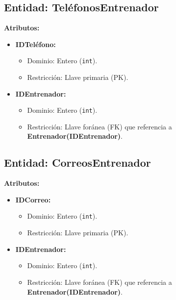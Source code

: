 \subsection*{Entidad: TeléfonosEntrenador}
\textbf{Atributos:}
\begin{itemize}
    \item \textbf{IDTeléfono:}
    \begin{itemize}
        \item Dominio: Entero (\texttt{int}).
        \item Restricción: Llave primaria (PK).
    \end{itemize}
    \item \textbf{IDEntrenador:}
    \begin{itemize}
        \item Dominio: Entero (\texttt{int}).
        \item Restricción: Llave foránea (FK) que referencia a \textbf{Entrenador(IDEntrenador)}.
    \end{itemize}
\end{itemize}

\subsection*{Entidad: CorreosEntrenador}
\textbf{Atributos:}
\begin{itemize}
    \item \textbf{IDCorreo:}
    \begin{itemize}
        \item Dominio: Entero (\texttt{int}).
        \item Restricción: Llave primaria (PK).
    \end{itemize}
    \item \textbf{IDEntrenador:}
    \begin{itemize}
        \item Dominio: Entero (\texttt{int}).
        \item Restricción: Llave foránea (FK) que referencia a \textbf{Entrenador(IDEntrenador)}.
    \end{itemize}
\end{itemize}

